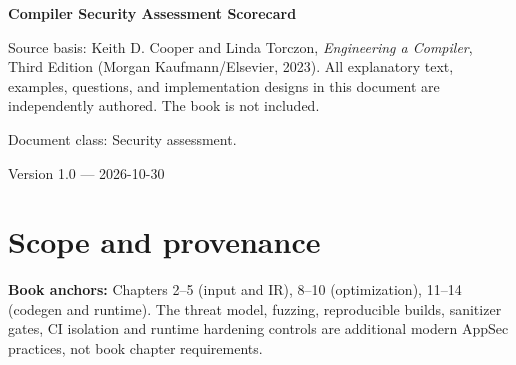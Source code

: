 \documentclass[10pt,letterpaper]{article}
\begin{document}
\begin{titlepage}
\centering\vspace*{1.0in}
{\Huge\bfseries\textcolor{CompilerBlue}{Compiler Security Assessment Scorecard}\par}
\vspace{.22in}{\Large Risk-ranked engineering assurance\par}
\vspace{.4in}{\large Compiler Engineering Documentation Suite\par}
\vfill
\begin{minipage}{.86\linewidth}\small
Source basis: Keith D. Cooper and Linda Torczon, \emph{Engineering a Compiler}, Third Edition (Morgan Kaufmann/Elsevier, 2023). All explanatory text, examples, questions, and implementation designs in this document are independently authored. The book is not included.\par\medskip
Document class: Security assessment.
\end{minipage}
\vfill\textcolor{CompilerGray}{Version 1.0 --- 2026-10-30}\par
\end{titlepage}
\tableofcontents\clearpage
\section{Scope and provenance}
\textbf{Book anchors:} Chapters 2--5 (input and IR), 8--10 (optimization), 11--14 (codegen and runtime). \modern The threat model, fuzzing, reproducible builds, sanitizer gates, CI isolation and runtime hardening controls are additional modern AppSec practices, not book chapter requirements.\par
\end{document}
